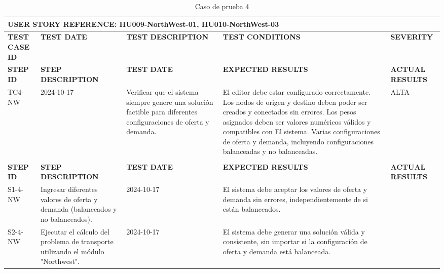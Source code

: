 \documentclass[stu, 12pt, letterpaper, donotrepeattitle, floatsintext, natbib]{apa7}
\begin{document}
\begin{longtable}{|p{2cm}|p{3cm}|p{3cm}|p{3cm}|p{3cm}|}
    \caption{Caso de prueba 4} \label{tab:casos_prueba4} \\
    \hline
    \multicolumn{5}{|l|}{\textbf{USER STORY REFERENCE: HU009-NorthWest-01, HU010-NorthWest-03}} \\ \hline
    \textbf{TEST CASE ID} & \textbf{TEST DATE} & \textbf{TEST DESCRIPTION} & \textbf{TEST CONDITIONS} & \textbf{SEVERITY} \\ \hline

    \endfirsthead
    \hline
    \textbf{STEP ID} & \textbf{STEP DESCRIPTION} & \textbf{TEST DATE} & \textbf{EXPECTED RESULTS} & \textbf{ACTUAL RESULTS} \\ \hline
    \endhead
    TC4-NW & 2024-10-17 & Verificar que el sistema siempre genere una solución factible para diferentes configuraciones de oferta y demanda. & El editor debe estar configurado correctamente. Los nodos de origen y destino deben poder ser creados y conectados sin errores. Los pesos asignados deben ser valores numéricos válidos y compatibles con El sistema. Varias configuraciones de oferta y demanda, incluyendo configuraciones balanceadas y no balanceadas. & ALTA                                                                                           \\ \\ \hline
    \textbf{STEP ID} & \textbf{STEP DESCRIPTION} & \textbf{TEST DATE} & \textbf{EXPECTED RESULTS} & \textbf{ACTUAL RESULTS} \\ \hline
    S1-4-NW & Ingresar diferentes valores de oferta y demanda (balanceados y no balanceados). & 2024-10-17 & El sistema debe aceptar los valores de oferta y demanda sin errores, independientemente de si están balanceados. &  \\ \hline
    S2-4-NW & Ejecutar el cálculo del problema de transporte utilizando el módulo "Northwest". & 2024-10-17 & El sistema debe generar una solución válida y consistente, sin importar si la configuración de oferta y demanda está balanceada. & \\ \hline
\end{longtable}
\end{document}
